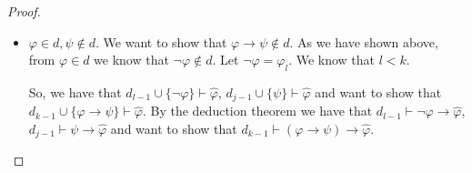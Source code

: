 \documentclass{article}
\theoremstyle{definition}
\theoremstyle{definition}
\theoremstyle{definition}
\newcommand*{\ra}{\rightarrow}
\newcommand{\PC}{$\mathsf{PC}$\xspace}
\begin{document}
\begin{proof}
\begin{itemize}
\begin{itemize}
                        Let us assume the opposite, that $d_{k-1} \cup \{\varphi \ra \psi\} \vdash
                            \hat{\varphi}$. By deduction theorem we have that $d_{k-1} \vdash (\varphi \ra
                            \psi) \ra \hat{\varphi}$.

                        Let $\Psi$ be a sequence we get by appending the proof of $\varphi \ra
                            \hat{\varphi}$ in $d_{k-1}$ and the proof of $\psi \ra \hat{\varphi}$ in
                        $d_{k-1}$ to the proof of $(\varphi \ra \psi) \ra \hat{\varphi}$ in $d_{k-1}$.
                        Then, let us append to $\Psi$ the formula $((\varphi \ra \psi) \ra
                            \hat{\varphi}) \ra ((\varphi \ra \hat{\varphi}) \ra ((\psi \ra \hat{\varphi})
                            \ra \hat{\varphi}))$, which is an instance of a \PC tautology $((\alpha \ra \beta)
                            \ra \gamma) \ra ( (\alpha \ra \gamma) \ra ((\beta \ra \gamma) \ra \gamma))$.
                        Then by \emph{modus ponens} we can infer $(\varphi \ra \hat{\varphi}) \ra
                            ((\psi \ra \hat{\varphi}) \ra \hat{\varphi})$, then we can infer $(\psi \ra
                            \hat{\varphi}) \ra \hat{\varphi}$ and finally we can infer $\hat{\varphi}$ thus
                        proving that $d_{k-1} \vdash \hat{\varphi}$ which is a contradiction. So we
                        know that $d_{k-1} \cup \{\varphi \ra \psi\} \not \vdash \hat{\varphi}$ so
                        $\varphi \ra \psi \in d$.
                  \item $\varphi \in d, \psi \not \in d$. We want to show that $\varphi \ra \psi \not \in d$. As we have shown above, from $\varphi \in d$ we know that $\lnot \varphi \not \in d$. Let $\lnot \varphi = \varphi_l$. We know that $l < k$.

                        So, we have that $d_{l-1} \cup \{\lnot \varphi\} \vdash \hat{\varphi}$,
                        $d_{j-1} \cup \{\psi\} \vdash \hat{\varphi}$ and want to show that $d_{k-1}
                            \cup \{\varphi \ra \psi\} \vdash \hat{\varphi}$. By the deduction theorem we
                        have that $d_{l-1} \vdash \lnot \varphi \ra \hat{\varphi}$, $d_{j-1} \vdash
                            \psi \ra \hat{\varphi}$ and want to show that $d_{k-1} \vdash (\varphi \ra
                            \psi) \ra \hat{\varphi}$.


\end{itemize}
\end{itemize}
\end{proof}
\end{document}
